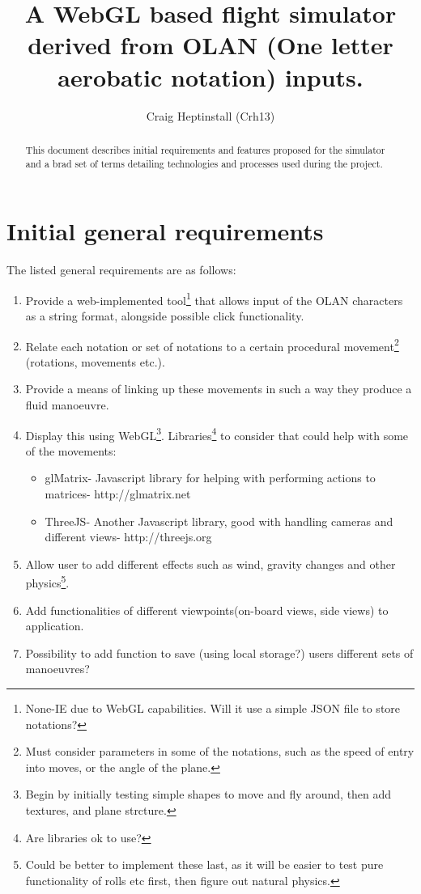 \documentclass{tufte-handout}
\title{A WebGL based flight simulator derived from OLAN (One letter aerobatic notation) inputs.}
\author{Craig Heptinstall (Crh13)}
\begin{document}
\maketitle%

\begin{abstract}
\noindent This document describes initial requirements and features proposed for the simulator and a brad set of terms detailing technologies and processes used during the project.
\end{abstract}

\section{Initial general requirements}\label{sec:page-layout}
The listed general requirements are as follows:
\begin{enumerate}
\item Provide a web-implemented tool\footnote{None-IE due to WebGL capabilities. Will it use a simple JSON file to store notations?} that allows input of the OLAN characters as a string format, alongside possible click functionality. 
\item Relate each notation or set of notations to a certain procedural movement\footnote{Must consider parameters in some of the notations, such as the speed of entry into moves, or the angle of the plane.} (rotations, movements etc.).
\item Provide a means of linking up these movements in such a way they produce a fluid manoeuvre.
\item Display this using WebGL\footnote{Begin by initially testing simple shapes to move and fly around, then add textures, and plane strcture.}. Libraries\footnote{Are libraries ok to use?} to consider that could help with some of the movements:
    \begin{itemize}
    \item glMatrix- Javascript library for helping with performing actions to matrices- http://glmatrix.net
    \item ThreeJS- Another Javascript library, good with handling cameras and different views- http://threejs.org
    \end{itemize}
\item Allow user to add different effects such as wind, gravity changes and other physics\footnote{Could be better to implement these last, as it will be easier to test pure functionality of rolls etc first, then figure out natural physics.}.
\item Add functionalities of different viewpoints(on-board views, side views) to application.
\item Possibility to add function to save (using local storage?) users different sets of manoeuvres?
\end{enumerate}
\end{document}
